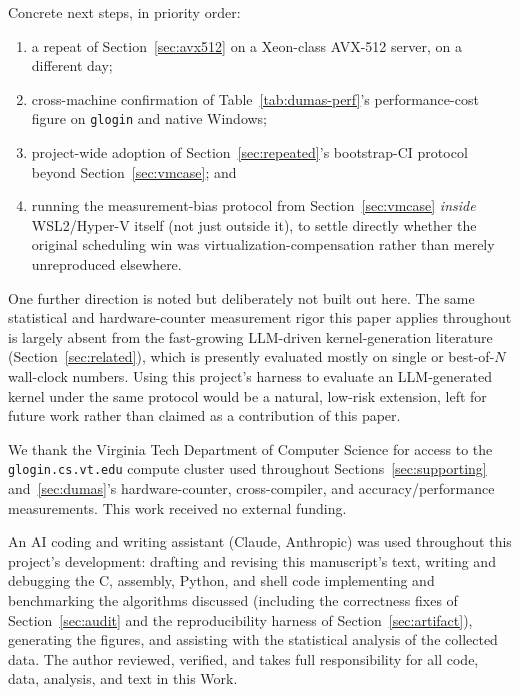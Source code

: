 \documentclass[acmsmall]{acmart}
\begin{document}
Concrete next steps, in priority order:
\begin{enumerate}
  \item a repeat of Section~\ref{sec:avx512} on a Xeon-class AVX-512
    server, on a different day;
  \item cross-machine confirmation of Table~\ref{tab:dumas-perf}'s
    performance-cost figure on \texttt{glogin} and native Windows;
  \item project-wide adoption of Section~\ref{sec:repeated}'s
    bootstrap-CI protocol beyond Section~\ref{sec:vmcase}; and
  \item running the measurement-bias protocol from
    Section~\ref{sec:vmcase} \emph{inside} WSL2/Hyper-V itself (not
    just outside it), to settle directly whether the original
    scheduling win was virtualization-compensation rather than merely
    unreproduced elsewhere.
\end{enumerate}
One further direction is noted but deliberately not built out here. The
same statistical and hardware-counter measurement rigor this paper
applies throughout is largely absent from the fast-growing LLM-driven
kernel-generation literature (Section~\ref{sec:related}), which is
presently evaluated mostly on single or best-of-$N$ wall-clock numbers.
Using this project's harness to evaluate an LLM-generated kernel under
the same protocol would be a natural, low-risk extension, left for
future work rather than claimed as a contribution of this paper.

\begin{acks}
We thank the Virginia Tech Department of Computer Science for access to
the \texttt{glogin.cs.vt.edu} compute cluster used throughout
Sections~\ref{sec:supporting} and~\ref{sec:dumas}'s hardware-counter,
cross-compiler, and accuracy/performance measurements. This work received
no external funding.

An AI coding and writing assistant (Claude, Anthropic) was used
throughout this project's development: drafting and revising this
manuscript's text, writing and debugging the C, assembly, Python, and
shell code implementing and benchmarking the algorithms discussed
(including the correctness fixes of Section~\ref{sec:audit} and the
reproducibility harness of Section~\ref{sec:artifact}), generating the
figures, and assisting with the statistical analysis of the collected
data. The author reviewed, verified, and takes full responsibility for
all code, data, analysis, and text in this Work.
\end{acks}



\end{document}

